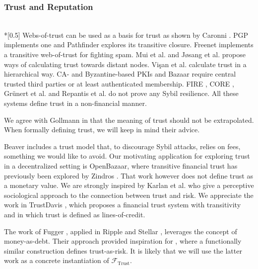 \subsubsection{Trust and Reputation} \ \\*[0.5\baselineskip]
  Webs-of-trust can be used as a basis for trust as shown by Caronni \cite{wot}. PGP
  \cite{pgp} implements one and Pathfinder \cite{pathfinder} explores its transitive
  closure. Freenet \cite{freenet} implements a transitive web-of-trust for fighting spam.
  Mui et al. \cite{mui} and J\o{}sang et al. \cite{beta} propose ways of calculating trust
  towards distant nodes.  Vi\c{s}an et al. \cite{vpc} calculate trust in a hierarchical
  way. CA- and Byzantine-based \cite{byzantine} PKIs \cite{pki} and Bazaar \cite{bazaar}
  require central trusted third parties or at least authenticated membership. FIRE
  \cite{fire}, CORE \cite{core}, Gr\"unert et al. \cite{ghkkw} and Repantis et al.
  \cite{rk} do not prove any Sybil resilience. All these systems define trust in a
  non-financial manner.

  We agree with Gollmann \cite{badtrust} in that the meaning of trust should not be
  extrapolated. When formally defining trust, we will keep in mind their advice.

  Beaver \cite{beaver} includes a trust model that, to discourage Sybil attacks, relies on
  fees, something we would like to avoid. Our motivating application for exploring trust
  in a decentralized setting is OpenBazaar, where transitive financial trust has
  previously been explored by Zindros \cite{dionyziz}. That work however does not define
  trust as a monetary value. We are strongly inspired by Karlan et al. \cite{kmrs} who
  give a perceptive sociological approach to the connection between trust and risk. We
  appreciate the work in TrustDavis \cite{davis}, which proposes a financial trust system
  with transitivity and in which trust is defined as lines-of-credit.

  The work of Fugger \cite{iou}, applied in Ripple \cite{ripple} and Stellar
  \cite{stellar}, leverages the concept of money-as-debt. Their approach provided
  inspiration for \cite{trustisrisk}, where a functionally similar construction defines
  trust-as-risk. It is likely that we will use the latter work as a concrete instantiation
  of $\mathcal{F}_{\mathrm{Trust}}$.

